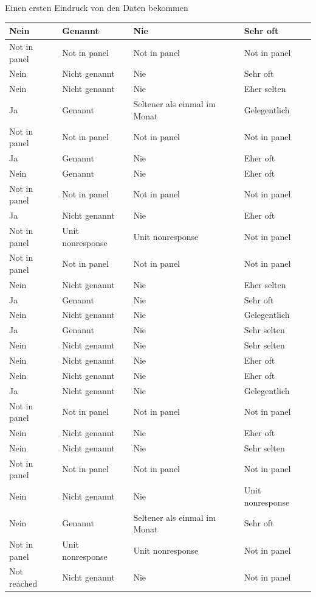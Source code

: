 \documentclass[ignorenonframetext,]{beamer}
\begin{document}
\begin{frame}{Einen ersten Eindruck von den Daten bekommen}
\begin{tabular}{l|l|l|l}
\hline
Nein & Genannt & Nie & Sehr oft\\
\hline
Not in panel & Not in panel & Not in panel & Not in panel\\
\hline
Nein & Nicht genannt & Nie & Sehr oft\\
\hline
Nein & Nicht genannt & Nie & Eher selten\\
\hline
Ja & Genannt & Seltener als einmal im Monat & Gelegentlich\\
\hline
Not in panel & Not in panel & Not in panel & Not in panel\\
\hline
Ja & Genannt & Nie & Eher oft\\
\hline
Nein & Genannt & Nie & Eher oft\\
\hline
Not in panel & Not in panel & Not in panel & Not in panel\\
\hline
Ja & Nicht genannt & Nie & Eher oft\\
\hline
Not in panel & Unit nonresponse & Unit nonresponse & Not in panel\\
\hline
Not in panel & Not in panel & Not in panel & Not in panel\\
\hline
Nein & Nicht genannt & Nie & Eher selten\\
\hline
Ja & Genannt & Nie & Sehr oft\\
\hline
Nein & Nicht genannt & Nie & Gelegentlich\\
\hline
Ja & Genannt & Nie & Sehr selten\\
\hline
Nein & Nicht genannt & Nie & Sehr selten\\
\hline
Nein & Nicht genannt & Nie & Eher oft\\
\hline
Nein & Nicht genannt & Nie & Eher oft\\
\hline
Ja & Nicht genannt & Nie & Gelegentlich\\
\hline
Not in panel & Not in panel & Not in panel & Not in panel\\
\hline
Nein & Nicht genannt & Nie & Eher oft\\
\hline
Nein & Nicht genannt & Nie & Sehr selten\\
\hline
Not in panel & Not in panel & Not in panel & Not in panel\\
\hline
Nein & Nicht genannt & Nie & Unit nonresponse\\
\hline
Nein & Genannt & Seltener als einmal im Monat & Sehr oft\\
\hline
Not in panel & Unit nonresponse & Unit nonresponse & Not in panel\\
\hline
Not reached & Nicht genannt & Nie & Not in panel\\

\end{tabular}
\end{frame}
\end{document}
